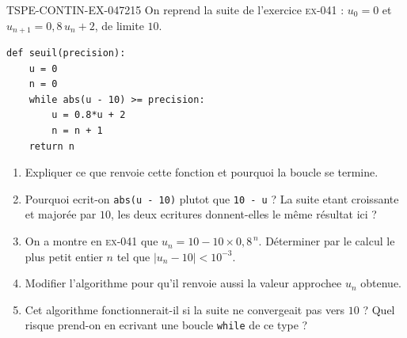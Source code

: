\begin{exercice}{TSPE-CONTIN-EX-047}{2}{15}
On reprend la suite de l'exercice \textsc{ex-041} : $u_0 = 0$ et $u_{n+1} = 0{,}8\,u_n + 2$, de limite $10$.

\begin{center}
\begin{minipage}{0.8\linewidth}
\begin{verbatim}
def seuil(precision):
    u = 0
    n = 0
    while abs(u - 10) >= precision:
        u = 0.8*u + 2
        n = n + 1
    return n
\end{verbatim}
\end{minipage}
\end{center}

\begin{enumerate}
  \item Expliquer ce que renvoie cette fonction et pourquoi la boucle se termine.
  \item Pourquoi ecrit-on \verb|abs(u - 10)| plutot que \verb|10 - u| ? La suite etant croissante et majorée par $10$, les deux ecritures donnent-elles le même résultat ici ?
  \item On a montre en \textsc{ex-041} que $u_n = 10 - 10 \times 0{,}8^{\,n}$. Déterminer par le calcul le plus petit entier $n$ tel que $\left|u_n - 10\right| < 10^{-3}$.
  \item Modifier l'algorithme pour qu'il renvoie aussi la valeur approchee $u_n$ obtenue.
  \item Cet algorithme fonctionnerait-il si la suite ne convergeait pas vers $10$ ? Quel risque prend-on en ecrivant une boucle \verb|while| de ce type ?
\end{enumerate}
\end{exercice}
